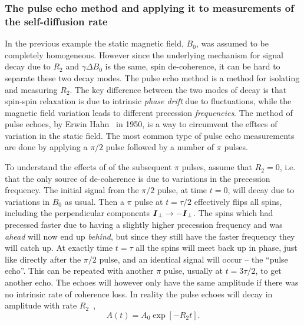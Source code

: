 \documentclass[11pt,a4paper, twocolumn,
swedish, english %
]{article}
\begin{document}
\subsubsection{The pulse echo method and applying it to
measurements of the self-diffusion rate} 
\label{sec:pulse-echo}
In the previous example the static magnetic field, $B_0$, was assumed
to be completely homogeneous. However since the underlying mechanism
for signal decay due to $R_2$ and $\gamma\Delta B_0$ is the same, spin
de-coherence, it can be hard to separate these two decay modes. The
pulse echo method is a method for isolating  and measuring $R_2$. 
The key difference between the two modes of decay is that spin-spin
relaxation is due to intrinsic \emph{phase drift} due to fluctuations,
while the magnetic field variation leads to different precession
\emph{frequencies}. The method of pulse echoes, by Erwin
Hahn~\cite{Hahn1950} in 1950, is a way to circumvent the efftecs of
variation in the static field. The most common type of pulse echo 
measurements are done by applying a $\pi/2$ pulse followed by a number
of $\pi$ pulses.

To understand the effects of of the subsequent $\pi$ pulses, assume that
$R_2=0$, i.e. that the only source of de-coherence is due to
variations in the precession frequency. The initial signal from the
$\pi/2$ pulse, at time $t=0$, will decay due to variations in $B_0$ as
usual. Then a $\pi$ pulse at $t=\tau/2$ effectively flips all spins,
including the perpendicular components
$\vb*I_\perp\to-\vb*I_\perp$. The spins which had precessed faster due
to having a slightly higher precession frequency and was \emph{ahead}
will now end up \emph{behind}, but since they still have the faster
frequency they will catch up. At exactly time $t=\tau$ all the spins
will meet back up in phase, just like directly after the $\pi/2$
pulse, and an identical signal will occur -- the ``pulse echo''. This
can be repeated with another $\pi$ pulse, usually at $t=3\tau/2$, to
get another echo. The echoes will however only have the same amplitude
if there was no intrinsic rate of coherence loss. In reality the pulse
echoes will decay in amplitude with rate $R_2$~\cite{Hahn1950},
\begin{equation}
A(t)=A_0\exp[-R_2t].
\end{equation}
\end{document}
